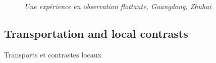 \bigskip


\begin{figure}[h!]
\begin{mdframed}

 \textit{Une expérience en observation flottante, Guangdong, Zhuhai}
\end{mdframed}
\end{figure}





\subsection{Transportation and local contrasts}{Transports et contrastes locaux}





